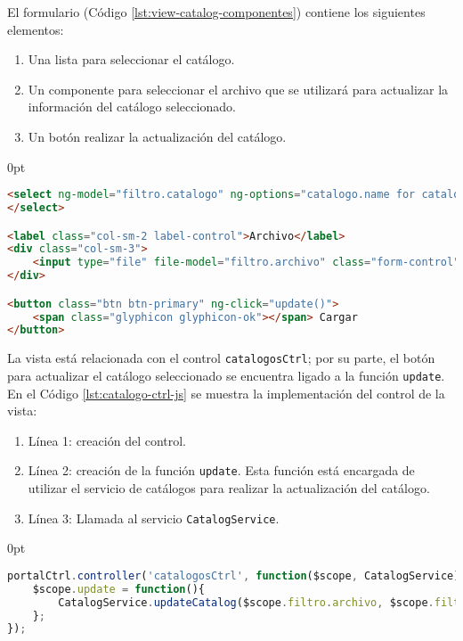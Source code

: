 \begin{enumerate}
\pagebreak

El formulario (Código \ref{lst:view-catalog-componentes}) contiene los siguientes elementos:
\begin{enumerate}
	\item Una lista para seleccionar el catálogo.
	\item Un componente para seleccionar el archivo que se utilizará para actualizar la información del catálogo seleccionado.
	\item Un botón realizar la actualización del catálogo.
\end{enumerate}
\begin{adjustwidth}{\listingfixwidth}{0pt}
\begin{lstlisting}[language=HTML, captionpos=b, caption={Elementos del formulario para seleccionar catálogo.}, label={lst:view-catalog-componentes}]
<select ng-model="filtro.catalogo" ng-options="catalogo.name for catalogo in catalogos" class="form-control">
</select>

<label class="col-sm-2 label-control">Archivo</label>
<div class="col-sm-3">
	<input type="file" file-model="filtro.archivo" class="form-control"/>
</div>

<button class="btn btn-primary" ng-click="update()">
	<span class="glyphicon glyphicon-ok"></span> Cargar
</button>
\end{lstlisting}
\end{adjustwidth}

La vista está relacionada con el control \texttt{catalogosCtrl}; por su parte, el botón para actualizar el catálogo seleccionado se encuentra ligado a la función \texttt{update}. En el Código \ref{lst:catalogo-ctrl-js} se muestra la implementación del control de la vista:

\begin{enumerate}
	\item Línea 1: creación del control. 
	\item Línea 2: creación de la función \texttt{update}. Esta función está encargada de utilizar el servicio de catálogos para realizar la actualización del catálogo.
	\item Línea 3: Llamada al servicio \texttt{CatalogService}.
\end{enumerate}

\pagebreak
\begin{adjustwidth}{\listingfixwidth}{0pt}
\begin{lstlisting}[language=Javascript, caption={Controlador de la vista Catálogo.}, captionpos=b, label={lst:catalogo-ctrl-js}]
portalCtrl.controller('catalogosCtrl', function($scope, CatalogService){
	$scope.update = function(){
		CatalogService.updateCatalog($scope.filtro.archivo, $scope.filtro.catalogo.name);
	};
});
\end{lstlisting}
\end{adjustwidth}


\end{enumerate}
